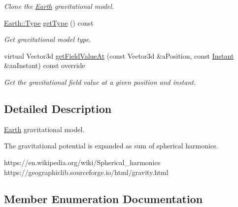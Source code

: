 \begin{DoxyCompactItemize}
\begin{DoxyCompactList}\small\item\em Clone the \hyperlink{classostk_1_1physics_1_1environment_1_1gravitational_1_1_earth}{Earth} gravitational model. \end{DoxyCompactList}\item 
\hyperlink{classostk_1_1physics_1_1environment_1_1gravitational_1_1_earth_a9895df78b5c5aab5e981bf765f8c0f05}{Earth\+::\+Type} \hyperlink{classostk_1_1physics_1_1environment_1_1gravitational_1_1_earth_aa65dd2a5ce980e8a4f7f502387c1ff61}{get\+Type} () const
\begin{DoxyCompactList}\small\item\em Get gravitational model type. \end{DoxyCompactList}\item 
virtual Vector3d \hyperlink{classostk_1_1physics_1_1environment_1_1gravitational_1_1_earth_a9e536649566761f4bdd467993abfcedd}{get\+Field\+Value\+At} (const Vector3d \&a\+Position, const \hyperlink{classostk_1_1physics_1_1time_1_1_instant}{Instant} \&an\+Instant) const override
\begin{DoxyCompactList}\small\item\em Get the gravitational field value at a given position and instant. \end{DoxyCompactList}\end{DoxyCompactItemize}


\subsection{Detailed Description}
\hyperlink{classostk_1_1physics_1_1environment_1_1gravitational_1_1_earth}{Earth} gravitational model. 

The gravitational potential is expanded as sum of spherical harmonics.

https\+://en.wikipedia.\+org/wiki/\+Spherical\+\_\+harmonics https\+://geographiclib.sourceforge.\+io/html/gravity.html 

\subsection{Member Enumeration Documentation}
\mbox{\label{classostk_1_1physics_1_1environment_1_1gravitational_1_1_earth_a9895df78b5c5aab5e981bf765f8c0f05}} 
